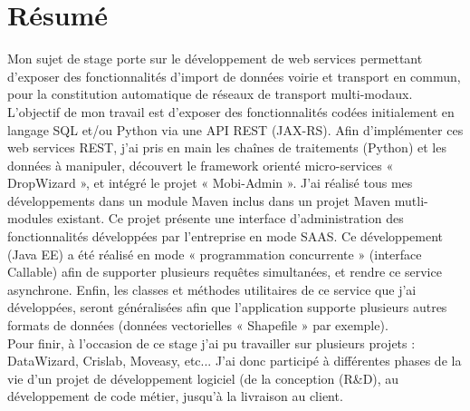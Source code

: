 \chapter*{Résumé}\label{Resume}

Mon sujet de stage porte sur le développement de web services permettant d’exposer des fonctionnalités d’import de données voirie et transport en commun, pour la constitution automatique de réseaux de transport multi-modaux. \\

L'objectif de mon travail est d'exposer des fonctionnalités codées initialement en langage SQL et/ou Python via une API REST (JAX-RS). Afin d'implémenter ces web services REST, j'ai pris en main les chaînes de traitements (Python) et les données à manipuler, découvert le framework orienté micro-services « DropWizard », et intégré le projet « Mobi-Admin ». J'ai réalisé tous mes développements dans un module Maven inclus dans un projet Maven mutli-modules existant. Ce projet présente une interface d'administration des fonctionnalités développées par l'entreprise en mode SAAS. Ce développement (Java EE) a été réalisé en mode « programmation concurrente » (interface Callable) afin de supporter plusieurs requêtes simultanées, et rendre ce service asynchrone. Enfin, les classes et méthodes utilitaires de ce service que j'ai développées, seront généralisées afin que l'application supporte plusieurs autres formats de données (données vectorielles « Shapefile » par exemple).\\

Pour finir, à l'occasion de ce stage j'ai pu travailler sur plusieurs projets : DataWizard, Crislab, Moveasy, etc... J'ai donc participé à différentes phases de la vie d'un projet de développement logiciel (de la conception (R&D), au développement de code métier, jusqu'à la livraison au client.\\
